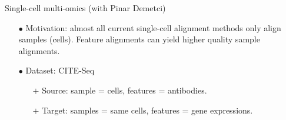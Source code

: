 \documentclass{beamer}
\begin{document}
\begin{frame}{Single-cell multi-omics (with Pinar Demetci)}
\scriptsize
\vspace{-2.7cm}
\begin{itemize}
  \item[$\bullet$] Motivation: almost all current single-cell alignment methods only
  align samples (cells). Feature alignments can yield higher quality
  sample alignments.
  \item[$\bullet$] Dataset: CITE-Seq \parencite{CITEseq}
  \begin{itemize}
    \scriptsize
    \setlength\itemindent{10pt}
    \item[$+$] Source: sample = cells, features = antibodies.
    \item[$+$] Target: samples = same cells, features = gene expressions.
  \end{itemize}
\end{itemize}






\end{frame}
\end{document}
